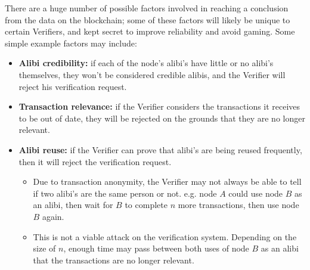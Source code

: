 There are a huge number of possible factors involved in reaching a conclusion from the data on the blockchain; some of these factors will likely be unique to certain Verifiers, and kept secret to improve reliability and avoid gaming. Some simple example factors may include:
\begin{itemize}
	\item \textbf{Alibi credibility:} if each of the node’s alibi’s have little or no alibi’s themselves, they won't be considered credible alibis, and the Verifier will reject his verification request.
	\item \textbf{Transaction relevance:} if the Verifier considers the transactions it receives to be out of date, they will be rejected on the grounds that they are no longer relevant.
	\item \textbf{Alibi reuse:} if the Verifier can prove that alibi’s are being reused frequently, then it will reject the verification request.
	\begin{itemize}
		\item Due to transaction anonymity, the Verifier may not always be able to tell if two alibi's are the same person or not. e.g. node $A$ could use node $B$ as an alibi, then wait for $B$ to complete $n$ more transactions, then use node $B$ again.
		\item This is not a viable attack on the verification system. Depending on the size of $n$, enough time may pass between both uses of node $B$ as an alibi that the transactions are no longer relevant.
	\end{itemize}
\end{itemize}